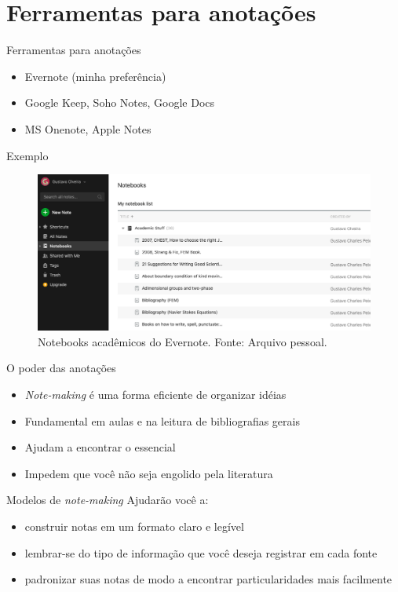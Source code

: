 \section{Ferramentas para anotações}

\begin{frame}{Ferramentas para anotações}
\begin{itemize}
\item Evernote (minha preferência)
\item Google Keep, Soho Notes, Google Docs
\item MS Onenote, Apple Notes
\end{itemize}
\end{frame}

\begin{frame}{Exemplo}
\begin{figure}
\centering
\includegraphics[scale=0.3]{figs/02/evernote}
\caption{Notebooks acadêmicos do Evernote. Fonte: Arquivo pessoal.}
\end{figure}
\end{frame}

\begin{frame}{O poder das anotações}
\begin{itemize}
\item \textit{Note-making} é uma forma eficiente de organizar idéias
\item Fundamental em aulas e na leitura de bibliografias gerais
\item Ajudam a encontrar o essencial
\item Impedem que você não seja engolido pela literatura
\end{itemize}
\end{frame}

\begin{frame}{Modelos de \textit{note-making}}
Ajudarão você a:
\begin{itemize}
\item construir notas em um formato claro e legível 
\item lembrar-se do tipo de informação que você deseja registrar em cada fonte
\item padronizar suas notas de modo a encontrar particularidades mais facilmente
\end{itemize}
\end{frame}

